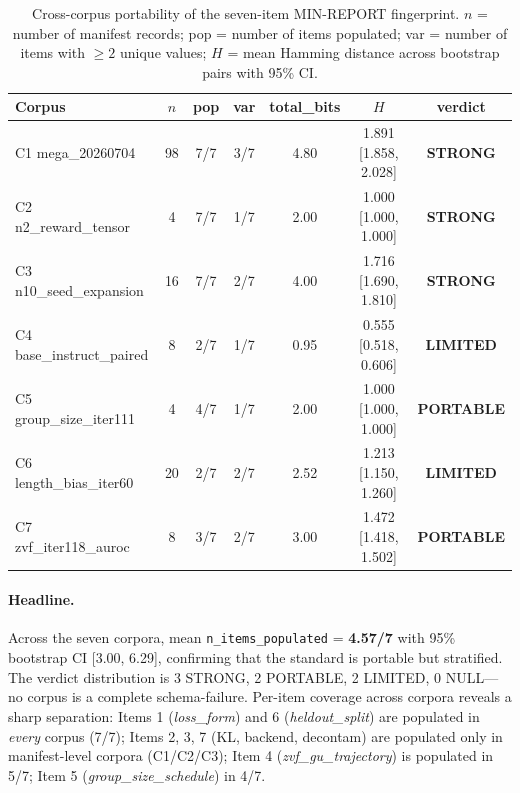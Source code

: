 \begin{table}[t]
\centering
\caption{Cross-corpus portability of the seven-item MIN-REPORT
fingerprint. $n$ = number of manifest records; pop = number of
items populated; var = number of items with $\geq 2$ unique values;
$H$ = mean Hamming distance across bootstrap pairs with 95\% CI.}
\label{tab:p5-cross-corpus}
\small
\begin{tabular}{@{}lcccccc@{}}
\toprule
Corpus & $n$ & pop & var & total\_bits & $H$ & verdict \\
\midrule
C1 mega\_20260704            &  98 & 7/7 & 3/7 & 4.80 & 1.891 [1.858, 2.028] & \textbf{STRONG} \\
C2 n2\_reward\_tensor         &   4 & 7/7 & 1/7 & 2.00 & 1.000 [1.000, 1.000] & \textbf{STRONG} \\
C3 n10\_seed\_expansion       &  16 & 7/7 & 2/7 & 4.00 & 1.716 [1.690, 1.810] & \textbf{STRONG} \\
C4 base\_instruct\_paired     &   8 & 2/7 & 1/7 & 0.95 & 0.555 [0.518, 0.606] & \textbf{LIMITED} \\
C5 group\_size\_iter111       &   4 & 4/7 & 1/7 & 2.00 & 1.000 [1.000, 1.000] & \textbf{PORTABLE} \\
C6 length\_bias\_iter60       &  20 & 2/7 & 2/7 & 2.52 & 1.213 [1.150, 1.260] & \textbf{LIMITED} \\
C7 zvf\_iter118\_auroc        &   8 & 3/7 & 2/7 & 3.00 & 1.472 [1.418, 1.502] & \textbf{PORTABLE} \\
\bottomrule
\end{tabular}
\end{table}

\paragraph{Headline.}
Across the seven corpora, mean \texttt{n\_items\_populated} =
\textbf{4.57/7} with 95\% bootstrap CI [3.00, 6.29], confirming that
the standard is portable but stratified. The verdict distribution is
3 STRONG, 2 PORTABLE, 2 LIMITED, 0 NULL---no corpus is a complete
schema-failure. Per-item coverage across corpora reveals a sharp
separation: Items 1 (\textit{loss\_form}) and 6
(\textit{heldout\_split}) are populated in \emph{every} corpus
(7/7); Items 2, 3, 7 (KL, backend, decontam) are populated only in
manifest-level corpora (C1/C2/C3); Item 4 (\textit{zvf\_gu\_trajectory})
is populated in 5/7; Item 5 (\textit{group\_size\_schedule}) in 4/7.

